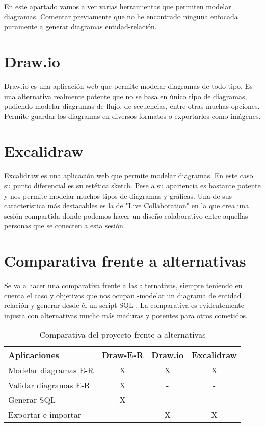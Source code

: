 
En este apartado vamos a ver varias herramientas que permiten modelar diagramas. Comentar previamente que no he encontrado ninguna enfocada puramente a generar diagramas entidad-relación.

\section{Draw.io}
Draw.io \cite{draw-io} es una aplicación web que permite modelar diagramas de todo tipo. Es una alternativa realmente potente que no se basa en único tipo de diagramas, pudiendo modelar diagramas de flujo, de secuencias, entre otras muchas opciones.
Permite guardar los diagramas en diversos formatos o exportarlos como imágenes.
\section{Excalidraw}
Excalidraw \cite{excalidraw} es una aplicación web que permite modelar diagramas. En este caso su punto diferencial es su estética sketch. Pese a su apariencia es bastante potente y nos permite modelar muchos tipos de diagramas y gráficas.
Una de sus característica más destacables es la de "Live Collaboration" en la que crea una sesión compartida donde podemos hacer un diseño colaborativo entre aquellas personas que se conecten a esta sesión.

\section{Comparativa frente a alternativas}
Se va a hacer una comparativa frente a las alternativas, siempre teniendo en cuenta el caso y objetivos que nos ocupan -modelar un diagrama de entidad relación y generar desde él un script SQL-.
La comparativa es evidentemente injusta con alternativas mucho más maduras y potentes para otros cometidos.

\begin{table}[h]
\centering
\begin{tabular}{l c c c}
\hline
\multicolumn{1}{l}{Aplicaciones} & \textbf{Draw-E-R} & \textbf{Draw.io} & \textbf{Excalidraw} \\
\hline
Modelar diagramas E-R & X & X & X \\
Validar diagramas E-R & X & - & - \\
Generar SQL & X & - & - \\
Exportar e importar & - & X & X \\
\hline
\end{tabular}
\caption{Comparativa del proyecto frente a alternativas}
\label{alternativas}
\end{table}

